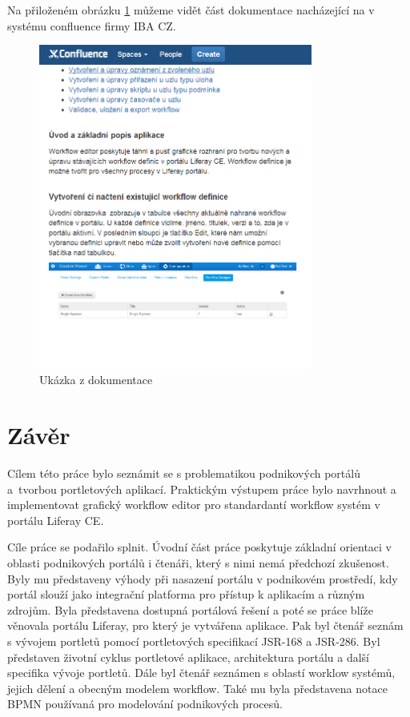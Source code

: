 \documentclass{fithesis}
\begin{document}
Na přiloženém obrázku \ref{fig:dokumentace} můžeme vidět část dokumentace nacházející na v systému confluence firmy IBA CZ.

\begin{figure}[htp]
\centering
\includegraphics[width=340px]{images/screen_confluence.png}
\caption{Ukázka z dokumentace}
\label{fig:dokumentace}
\end{figure}

\chapter{Závěr}
Cílem této práce bylo seznámit se s problematikou podnikových portálů a~tvorbou portletových aplikací. Praktickým výstupem práce bylo navrhnout a implementovat grafický workflow editor pro standardantí workflow systém v portálu Liferay CE.

Cíle práce se podařilo splnit. Úvodní část práce poskytuje základní orientaci v oblasti podnikových portálů i čtenáři, který s nimi nemá předchozí zkušenost. Byly mu představeny výhody při nasazení portálu v podnikovém prostředí, kdy portál slouží jako integrační platforma pro přístup k aplikacím a různým zdrojům. Byla představena dostupná portálová řešení a poté se práce blíže věnovala portálu Liferay, pro který je vytvářena aplikace. Pak byl čtenář seznám s vývojem portletů pomocí portletových specifikací JSR-168 a JSR-286. Byl představen životní cyklus portletové aplikace, architektura portálu a další specifika vývoje portletů. Dále byl čtenář seznámen s oblastí worklow systémů, jejich dělení a obecným modelem workflow. Také mu byla představena notace BPMN používaná pro modelování podnikových procesů.
\end{document}
